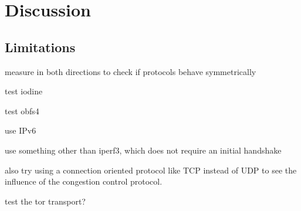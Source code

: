 
\chapter{Discussion}
\label{chap:discussion}
\section{Limitations}

measure in both directions to check if protocols behave symmetrically

test iodine

test obfs4

use IPv6

use something other than iperf3, which does not require an initial handshake

also try using a connection oriented protocol like TCP instead of UDP to see the influence of the congestion control protocol.

test the tor transport? 
